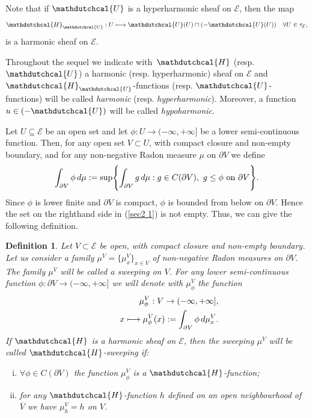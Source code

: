 \documentclass{amsart}
\newtheorem{defn}[thm]{Definition}
\numberwithin{equation}{section}
\def \p{{\phi}}
\def \Hd{{\mathdutchcal{H}}}
\def \Ec{{\mathcal{E}}}
\def \Ud{{\mathdutchcal{U}}}
\begin{document}
{Note that if $\Ud$ is a hyperharmonic sheaf on $\Ec$, then the map 
$$
\Hd_{\Ud}: U \longmapsto \Ud(U) \cap (-\Ud(U)) \quad \forall U \in \tau_{\Ec},
$$
is a harmonic sheaf on $\Ec$. 

Throughout the sequel we indicate with\ $\Hd$ (resp. $\Ud$) a harmonic (resp. hyperharmonic) sheaf on $\Ec$ and $\Hd_{\Ud}$-functions (resp. $\Ud$-functions) will be called {\it harmonic} (resp. {\it hyperharmonic}). Moreover, a function $u \in (-\Ud)$ will be called \textit{hypoharmonic}.

\vspace{2mm}
Let $U \subseteq \Ec$ be an open set and let $\p: U \rightarrow (-\infty,+\infty]$ be a lower semi-continuous function. Then, for any open set $V \subset U$, with compact closure and non-empty boundary, and for any non-negative
 Radon measure $\mu$ on $\partial V$ we define 
\begin{equation}
	\label{sec2 1}
\int_{\partial V} \p \, {\rm d}\mu : = \sup \Biggl\{\int_{\partial V} g \, {\rm d}\mu : g \in {C}(\partial V), \ g \leq \p \ \text{on} \ \partial V \Biggl\}.
\end{equation}
Since $\p$ is lower finite and $\partial V$ is compact, $\p$ is bounded from below on  $\partial V$. Hence the set on the righthand side in (\ref{sec2 1}) is not empty. {Thus,} we can give the following definition.

\begin{defn} \label{hsweeping}
Let $V\subset \Ec$ be %
open, with compact closure and non-empty boundary. Let us consider a family  $\mu^V=\{\mu^V_x\}_{x \in V}$ of non-negative Radon measures on $\partial V$. The family $\mu^V$ will be called a \textup{sweeping on $V$}. For any lower semi-continuous function $\p: \partial V \rightarrow (-\infty,+\infty]$ we will denote with $\mu^V_\p$ the function
\begin{eqnarray*}
	&& \mu^V_\p : V \to (-\infty,+\infty],\\
 && \qquad x  \longmapsto  \mu^V_\p (x) := \int_{\partial V} \p \, {\rm d}\mu^V_x.
\end{eqnarray*}
If $\Hd$ is a harmonic sheaf on $\Ec$, then the sweeping $\mu^V$ will be called $\Hd$\textup{-sweeping} if:
\begin{enumerate}[(i)]
\item $\forall \p \in {C}(\partial V)$ the function $\mu^V_\p$ is a $\Hd$-function;
\item for any $\Hd$-function $h$ defined on an open neighbourhood of $\overline{V}$ we have $\mu^V_h = h$ on $V$.
\end{enumerate}
\end{defn}

}
\end{document}
